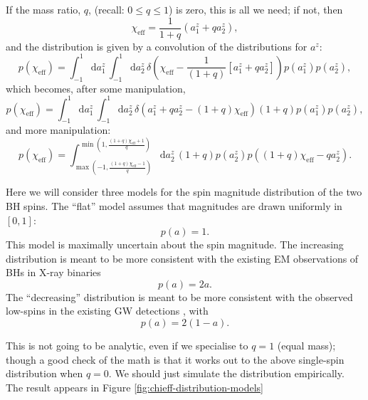 \documentclass[modern]{aastex61}
\newcommand{\chieff}{\chi_\mathrm{eff}}
\newcommand{\dd}{\mathrm{d}}
\begin{document}
If the mass ratio, $q$, (recall: $0 \leq q \leq 1$) is zero, this is
all we need; if not, then
\begin{equation}
\chieff = \frac{1}{1+q}\left(a_1^z + q a_2^z\right),
\end{equation}
and the distribution is given by a convolution of the distributions
for $a^z$:
\begin{equation}
p\left(\chieff \right) = \int_{-1}^1 \dd a_1^z \, \int_{-1}^1 \dd a_2^z \, \delta\left( \chieff - \frac{1}{(1+q)} \left[a_1^z + q a_2^z \right]\right) p\left( a_1^z\right) p\left(a_2^z\right),
\end{equation}
which becomes, after some manipulation,
\begin{equation}
p\left(\chieff \right) = \int_{-1}^1 \dd a_1^z \, \int_{-1}^1 \dd a_2^z \, \delta\left( a_1^z + q a_2^z - (1+q)\chieff \right) (1+q) p\left( a_1^z\right) p\left(a_2^z\right),
\end{equation}
and more manipulation:
\begin{equation}
p\left(\chieff \right) = \int_{\max\left(-1, \frac{(1+q)\chieff - 1}{q} \right)}^{\min\left(1, \frac{(1+q)\chieff+1}{q}\right)} \dd a_2^z \, (1+q) p\left(a_2^z\right) p\left((1+q)\chieff - q a_2^z \right).
\end{equation}

Here we will consider three models for the spin magnitude distribution
of the two \ac{BH} spins.  The ``flat'' model assumes that magnitudes
are drawn uniformly in $[0, 1]$:
\begin{equation}
  \label{eq:flat-def}
  p(a) = 1.
\end{equation}
This model is maximally uncertain about the spin magnitude.  The
increasing distribution is meant to be more consistent with the
existing \ac{EM} observations of \acp{BH} in X-ray binaries
\citep{Miller2015}
\begin{equation}
  \label{eq:increasing-def}
  p(a) = 2a.
\end{equation}
The ``decreasing'' distribution is meant to be more consistent with
the observed low-spins in the existing \ac{GW} detections
\citep{O1-BBH}, with
\begin{equation}
  \label{eq:decreasing-def}
  p(a) = 2(1-a).
\end{equation}

This is not going to be analytic, even if we specialise to $q = 1$
(equal mass); though a good check of the math is that it works out to
the above single-spin distribution when $q=0$.  We should just
simulate the distribution empirically.  The result appears in Figure
\ref{fig:chieff-distribution-models}
\end{document}
